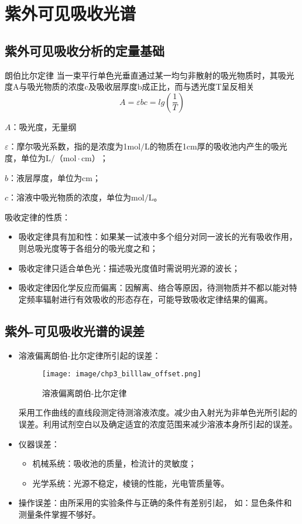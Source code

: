 \section{紫外可见吸收光谱}
\subsection{紫外可见吸收分析的定量基础}
\begin{theorem*}{朗伯比尔定律}
    当一束平行单色光垂直通过某一均匀非散射的吸光物质时，其吸光度$\mathrm{A}$与吸光物质的浓度$\mathrm{c}$及吸收层厚度$\mathrm{b}$成正比，而与透光度T呈反相关
    \begin{equation*}
        A=\varepsilon bc =lg(\frac{1}{T})
    \end{equation*}
\end{theorem*}
\begin{note}
$A$：吸光度，无量纲

$\varepsilon$：摩尔吸光系数，指的是浓度为1$ \mathrm{mol/L}$的物质在1$\mathrm{cm}$厚的吸收池内产生的吸光度，单位为$\mathrm{L/（mol\cdot cm）}$；

$b$：液层厚度，单位为$\mathrm{cm}$；

$c$：溶液中吸光物质的浓度，单位为$\mathrm{mol/L}$。
\end{note}

吸收定律的性质：
\begin{itemize}
    \item 吸收定律具有加和性：如果某一试液中多个组分对同一波长的光有吸收作用，则总吸光度等于各组分的吸光度之和；
    \item 吸收定律只适合单色光：描述吸光度值时需说明光源的波长；
    \item 吸收定律因化学反应而偏离：因解离、络合等原因，待测物质并不都以能对特定频率辐射进行有效吸收的形态存在，可能导致吸收定律结果的偏离。
\end{itemize}

\subsection{紫外-可见吸收光谱的误差}
\begin{itemize}
    \item  溶液偏离朗伯-比尔定律所引起的误差：
    \begin{figure}[h]
        \centering
        \texttt{[image: image/chp3\_billlaw\_offset.png]}
        \label{fig:chp3offset}
        \caption{溶液偏离朗伯-比尔定律}
    \end{figure}
采用工作曲线的直线段测定待测溶液浓度。减少由入射光为非单色光所引起的误差。利用试剂空白以及确定适宜的浓度范围来减少溶液本身所引起的误差。
    \item  仪器误差：
    \begin{itemize}
        \item 机械系统：吸收池的质量，检流计的灵敏度；
        \item 光学系统：光源不稳定，棱镜的性能，光电管质量等。
    \end{itemize}
    \item  操作误差：由所采用的实验条件与正确的条件有差别引起，
    如：显色条件和测量条件掌握不够好。
\end{itemize}

